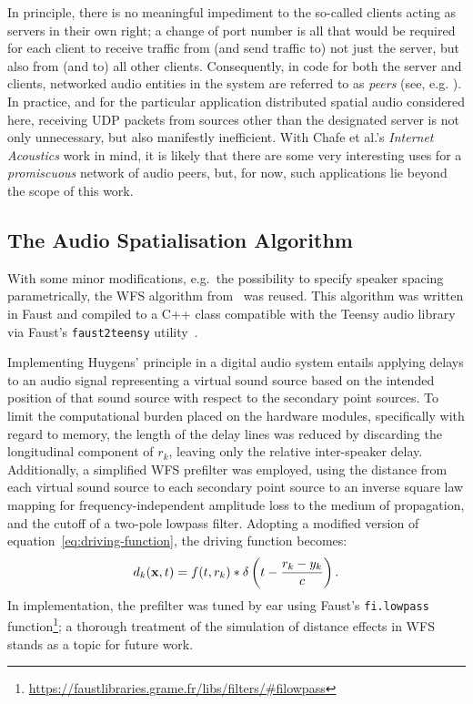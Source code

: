 In principle, there is no meaningful impediment to the so-called
clients acting as servers in their own right; a change of port number is all
that would be required for each client to receive traffic from (and send
traffic to) not just the server, but also from (and to) all other clients.
Consequently, in code for both the server and clients, networked audio entities
in the system are referred to as \textit{peers} (see, e.g.
).
In practice, and for the particular application
\textemdash{} distributed spatial audio \textemdash{}
considered here, receiving UDP packets from sources other than the designated
server is not only unnecessary, but also manifestly inefficient.
With Chafe et al.'s \textit{Internet Acoustics} work in mind, it is likely that
there are some very interesting uses for a \textit{promiscuous} network
of audio peers, but, for now, such applications lie beyond the scope of this
work.


\subsection{The Audio Spatialisation Algorithm}\label{subsec:wfs-algorithm}

With some minor modifications, e.g.\ the possibility to specify speaker spacing
parametrically, the WFS algorithm
from~\citep{rushton_microcontroller-based_2023} was reused.
This algorithm was written in Faust and compiled to
a C++ class compatible with the Teensy audio library via Faust's
\texttt{faust2teensy} utility~\citep{michon_real_2019}.


Implementing Huygens' principle in a digital audio system entails applying
delays to an audio signal representing a virtual sound source based on the
intended position of that sound source with respect to the secondary point
sources.
To limit the computational burden placed on the hardware modules, specifically
with regard to memory, the length of the delay lines was reduced by discarding
the longitudinal component of $r_k$, leaving only the relative inter-speaker
delay.
Additionally, a simplified WFS prefilter was employed, using the distance
from each virtual sound source to each secondary point source to an inverse
square law mapping for frequency-independent amplitude loss to the medium of
propagation, and the cutoff of a two-pole lowpass filter.
Adopting a modified version of equation~\eqref{eq:driving-function}, the
driving function becomes:
\begin{equation}
    \label{eq:simple-driving-function}
    d_k(\mathbf{x},t) = f(t, r_k) \ast \delta\left(t - \frac{r_k-y_k}{c}\right).
\end{equation}
In implementation, the prefilter was tuned by ear using Faust's
\texttt{fi.lowpass} function\footnote{
    \url{https://faustlibraries.grame.fr/libs/filters/\#filowpass}
};
a thorough treatment of the simulation of distance effects in WFS stands as a
topic for future work.

